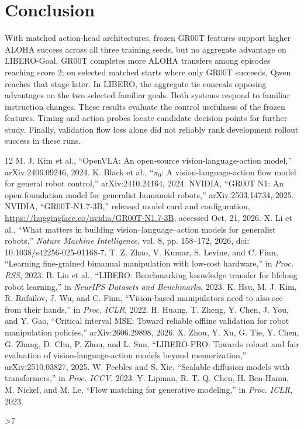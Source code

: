 \documentclass[conference]{IEEEtran}
\begin{document}
\newpage
\section{Conclusion}
With matched action-head architectures, frozen GR00T features support higher
ALOHA success across all three training seeds, but no aggregate advantage
on LIBERO-Goal. GR00T completes more ALOHA transfers among episodes reaching
score 2; on selected matched starts where only GR00T succeeds, Qwen reaches
that stage later. In LIBERO, the aggregate tie conceals opposing advantages
on the two selected familiar goals. Both systems respond to familiar
instruction changes. These results evaluate the control usefulness of the
frozen features. Timing and action probes locate candidate decision points for further study. Finally, validation flow
loss alone did not reliably rank development rollout success in these runs.

\begin{thebibliography}{12}
 M. J. Kim et al., ``OpenVLA: An open-source vision-language-action
model,'' arXiv:2406.09246, 2024.
 K. Black et al., ``$\pi_0$: A vision-language-action flow model for
general robot control,'' arXiv:2410.24164, 2024.
 NVIDIA, ``GR00T N1: An open foundation model for generalist
humanoid robots,'' arXiv:2503.14734, 2025.
 NVIDIA, ``GR00T-N1.7-3B,'' released model card and configuration,
\url{https://huggingface.co/nvidia/GR00T-N1.7-3B}, accessed Oct. 21, 2026.
 X. Li et al., ``What matters in building vision--language--action
models for generalist robots,'' \emph{Nature Machine Intelligence}, vol. 8,
pp. 158--172, 2026, doi: 10.1038/s42256-025-01168-7.
 T. Z. Zhao, V. Kumar, S. Levine, and C. Finn, ``Learning fine-grained
bimanual manipulation with low-cost hardware,'' in \emph{Proc. RSS}, 2023.
 B. Liu et al., ``LIBERO: Benchmarking knowledge transfer for
lifelong robot learning,'' in \emph{NeurIPS Datasets and Benchmarks}, 2023.
 K. Hsu, M. J. Kim, R. Rafailov, J. Wu, and C. Finn,
``Vision-based manipulators need to also see from their hands,''
in \emph{Proc. ICLR}, 2022.
 H. Huang, T. Zheng, Y. Chen, J. You, and Y. Gao, ``Critical interval
MSE: Toward reliable offline validation for robot manipulation policies,''
arXiv:2606.29898, 2026.
 X. Zhou, Y. Xu, G. Tie, Y. Chen, G. Zhang, D. Chu, P. Zhou,
and L. Sun, ``LIBERO-PRO: Towards robust and fair evaluation of vision-language-action
models beyond memorization,'' arXiv:2510.03827, 2025.
 W. Peebles and S. Xie, ``Scalable diffusion models with transformers,''
in \emph{Proc. ICCV}, 2023.
 Y. Lipman, R. T. Q. Chen, H. Ben-Hamu, M. Nickel, and M. Le,
``Flow matching for generative modeling,'' in \emph{Proc. ICLR}, 2023.
\end{thebibliography}
\clearpage
\ifnum\value{page}>7
  \PackageError{camera-ready}{Manuscript exceeds six pages}{Reduce content without changing the conference layout.}
\fi
\end{document}
